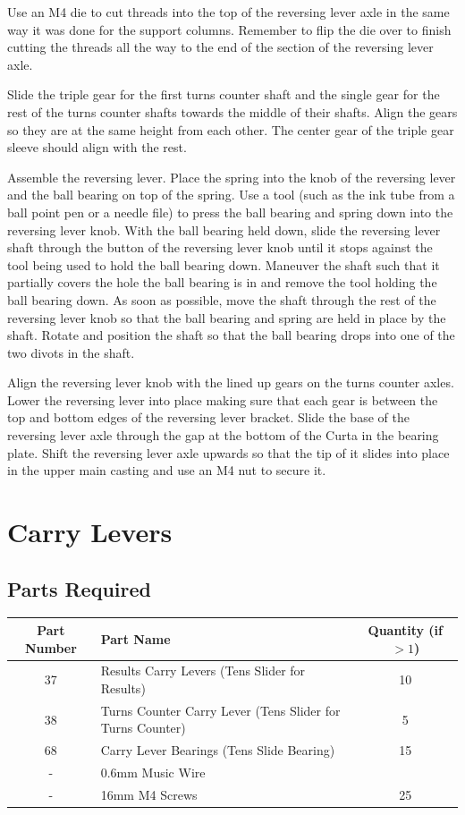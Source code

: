 \documentclass[openany]{book}
\begin{document}
Use an M4 die to cut threads into the top of the reversing lever axle in the same way it was done for the support columns. Remember to flip the die over to finish cutting the threads all the way to the end of the section of the reversing lever axle.

Slide the triple gear for the first turns counter shaft and the single gear for the rest of the turns counter shafts towards the middle of their shafts. Align the gears so they are at the same height from each other. The center gear of the triple gear sleeve should align with the rest.

Assemble the reversing lever. Place the spring into the knob of the reversing lever and the ball bearing on top of the spring. Use a tool (such as the ink tube from a ball point pen or a needle file) to press the ball bearing and spring down into the reversing lever knob. With the ball bearing held down, slide the reversing lever shaft through the button of the reversing lever knob until it stops against the tool being used to hold the ball bearing down. Maneuver the shaft such that it partially covers the hole the ball bearing is in and remove the tool holding the ball bearing down. As soon as possible, move the shaft through the rest of the reversing lever knob so that the ball bearing and spring are held in place by the shaft. Rotate and position the shaft so that the ball bearing drops into one of the two divots in the shaft.

Align the reversing lever knob with the lined up gears on the turns counter axles. Lower the reversing lever into place making sure that each gear is between the top and bottom edges of the reversing lever bracket. Slide the base of the reversing lever axle through the gap at the bottom of the Curta in the bearing plate. Shift the reversing lever axle upwards so that the tip of it slides into place in the upper main casting and use an M4 nut to secure it.





\chapter{Carry Levers}
\section{Parts Required}
\begin{table}[!ht]
	\centering
	\begin{tabular}{clc}
		Part Number & Part Name & Quantity (if $>1$) \\ \hline
		37 & Results Carry Levers (Tens Slider for Results) & 10 \\
		38 & Turns Counter Carry Lever (Tens Slider for Turns Counter) & 5 \\
		68 & Carry Lever Bearings (Tens Slide Bearing) & 15 \\ \hline \hline
		- & 0.6mm Music Wire & \\
		- & 16mm M4 Screws & 25
	\end{tabular}
\end{table}
\end{document}
